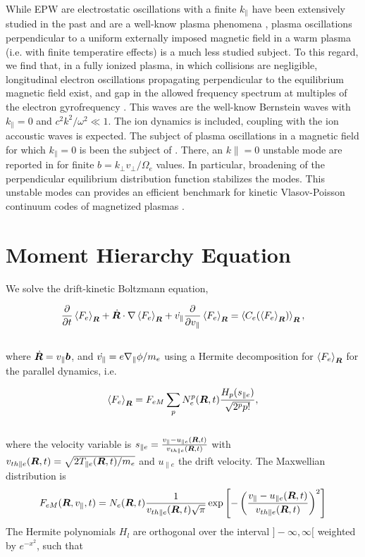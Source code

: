 \documentclass[final]{jpp}
\begin{document}
While EPW are electrostatic oscillations with a finite $k_\parallel$ have been extensively studied in the past and are a well-know plasma phenomena \citep{Tonks1929,Landau1946,ONeil1965,Jorge2019}, plasma oscillations perpendicular to a uniform externally imposed magnetic field in a warm plasma (i.e. with finite temperatire effects) is a much less studied subject. To this regard, we find that, in a fully ionized plasma, in which collisions are negligible, longitudinal electron oscillations propagating perpendicular to the equilibrium magnetic field exist, and gap in the allowed frequency spectrum at multiples of the electron gyrofrequency \citep{Bernstein1957}. This waves are the well-know Bernstein waves with $k_\parallel =0$ and $c^2 k^2/\omega^2 \ll 1$. The ion dynamics is included, coupling with the ion accoustic waves is expected. The subject of plasma oscillations in a magnetic field for which $k_\parallel =0$ is been the subject of \citep{Gross1950,Sen1952,Harris1959,Dory1965}. There, an $k\parallel =0$ unstable mode are reported in \citet{Dory1965} for finite $b = k_\perp v_\perp / \Omega_e$ values. In particular, broadening of the perpendicular equilibrium distribution function stabilizes the modes. This unstable modes can provides an efficient benchmark for kinetic Vlasov-Poisson continuum codes of magnetized plasmas \citep{Vogman2014}.


\section{Moment Hierarchy Equation}

We solve the drift-kinetic Boltzmann equation,

\begin{align} \label{eq:dFedt}
\frac{\partial}{\partial t} \left< F_e \right>_{\bm{R}} + \dot {\bm{R}}\cdot \nabla \left< F_e \right>_{\bm{R}} + \dot {v_{\parallel}} \frac{\partial }{ \partial v_{\parallel}} \left< F_e \right>_{\bm{R}} =\left<  C_{e}(\left< F_e \right>_{\bm{R}}) \right>_{\bm{R}},
\end{align}
\\
where $\dot {\bm{R}} = v_\parallel \bm{b}$, and $\dot {v_{\parallel}} = e \nabla_\parallel \phi/m_e$ using a Hermite decomposition for $\left< F_e \right>_{\bm{R}}$ for the parallel dynamics, i.e.

\begin{align}
\left< F_e \right>_{\bm{R}} = F_{eM} \sum_p N_e^p(\bm{R},t) \frac{H_p(s_{\parallel e})}{\sqrt{2^p p!}},
\end{align}
\\
where the velocity variable is $s_{\parallel e} = \frac{v_\parallel-u_{\parallel e}(\bm{R},t)}{v_{th \parallel e}(\bm{R},t)}$ with $v_{th \parallel e}(\bm{R},t) = \sqrt{2 T_{\parallel e}(\bm{R},t)/m_e}$ and $u_{\parallel e}$ the drift velocity. The Maxwellian distribution is
\begin{equation}
F_{eM}(\bm{R},v_{\parallel},t)=N_e(\bm{R},t)\frac{1}{v_{th\parallel e}(\bm{R},t)\sqrt{\pi}}\exp\left[-\left(\frac{v_\parallel-u_{\parallel e}(\bm{R},t)}{v_{th \parallel e}(\bm{R},t)}\right)^2\right]    
\end{equation}{}
The Hermite polynomials $H_l$ are orthogonal over the interval $] -\infty, \infty[$ weighted by $e^{-x^2}$, such that
\end{document}
